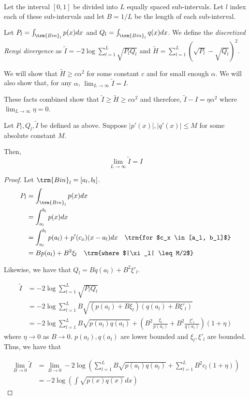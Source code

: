 \documentclass{article}
\begin{document}
Let the interval $[0,1]$ be divided into $L$ equally spaced sub-intervals. Let $l$ index each of these sub-intervals and let $B = 1/L$ be the length of each sub-interval.

Let $P_l = \int_{\trm{Bin}_l} p(x) dx$ and $Q_l = \int_{\trm{Bin}_l} q(x)dx$. We define the \emph{discretized Renyi divergence} as $\tilde{I} = -2 \log \sum_{l=1}^L \sqrt{P_l Q_l} $ and $\tilde{H} = \sum_{l=1}^L (\sqrt{P_l} - \sqrt{Q_l})^2$. 

We will show that $\tilde{H} \geq c \alpha^2$ for some constant $c$ and for small enough $\alpha$. We will also show that, for any $\alpha$, $\lim_{L \rightarrow \infty} \tilde{I} = I$.

These facts combined show that $\tilde{I} \geq \tilde{H} \geq c \alpha^2$ and therefore, $\tilde{I} - I = \eta \alpha^2$ where $\lim_{L \rightarrow \infty} \eta = 0$. 
 
\begin{proposition}
Let $P_l, Q_l, \tilde{I}$ be defined as above. Suppose $|p'(x)|, |q'(x)| \leq M$ for some absolute constant $M$.

Then,
\[
\lim_{L \rightarrow \infty} \tilde{I} = I
\]
\end{proposition}

\begin{proof}

Let $\trm{Bin}_l = [a_l, b_l]$. 
\begin{align*}
P_l &= \int_{\trm{Bin}_l} p(x) dx \\
  &= \int_{a_l}^{b_l} p(x) dx \\
 &= \int_{a_l}^{b_l} p(a_l) + p'(c_x) (x - a_l) dx \quad \trm{for $c_x \in [a_l, b_l]$}\\
 &= B p(a_l) + B^2 \xi_l \quad \trm{where $|\xi_l| \leq M/2$}
\end{align*}

Likewise, we have that $Q_l = B q(a_l) + B^2 \xi'_l$. 

\begin{align*}
\tilde{I} &= -2 \log \sum_{l=1}^L \sqrt{ P_l Q_l} \\
 &= -2 \log \sum_{l=1}^L B \sqrt{ (p(a_l) + B\xi_l)(q(a_l) + B \xi'_l) } \\
 &= -2 \log \sum_{l=1}^L B \sqrt{ p(a_l) q(a_l) } + \left(B^2 \frac{\xi_l }{p(a_l)} 
   + B^2 \frac{\xi'_l}{q(a_l)} \right)(1+\eta) 
\end{align*}
where $\eta \rightarrow 0$ as $B \rightarrow 0$. $p(a_l), q(a_l)$ are lower bounded and $\xi_l, \xi'_l$ are bounded. Thus, we have that

\begin{align*}
\lim_{B \rightarrow 0} \tilde{I} &= \lim_{B \rightarrow 0} -2 \log 
  \left( \sum_{l=1}^L B \sqrt{p(a_l) q(a_l)} + \sum_{l=1}^L B^2 c_l (1 + \eta) \right) \\
 &= -2 \log \left( \int \sqrt{p(x) q(x)} dx \right) 
\end{align*} 

\end{proof}
\end{document}
